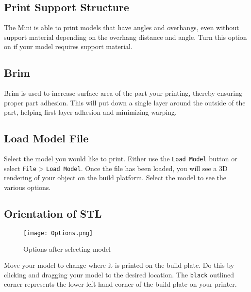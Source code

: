 \subsection{Print Support Structure}

The Mini is able to print models that have angles and overhangs, even without support material depending on the overhang distance and angle. Turn this option on if your model requires support material.

\subsection{Brim}

Brim is used to increase surface area of the part your printing, thereby ensuring proper part adhesion. This will put down a single layer around the outside of the part, helping first layer adhesion and minimizing warping.

\subsection{Load Model File}

Select the model you would like to print. Either use the \texttt{Load Model} button or select \texttt{File} > \texttt{Load Model}. Once the file has been loaded, you will see a 3D rendering of your object on the build platform. Select the model to see the various options. 

\subsection{Orientation of STL}

\begin{figure}[hbt]
\centering
\texttt{[image: Options.png]}
\caption{Options after selecting model}
\label{fig:Orientation}
\end{figure}

Move your model to change where it is printed on the build plate. Do this by clicking and dragging your model to the desired location. The \texttt{black} outlined corner represents the lower left hand corner of the build plate on your printer. 


